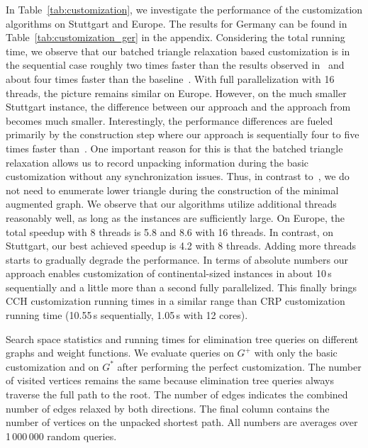 \documentclass[a4paper, english, cleveref]{lipics-v2021}
\begin{document}
In Table~\ref{tab:customization}, we investigate the performance of the customization algorithms on Stuttgart and Europe.
The results for Germany can be found in Table~\ref{tab:customization_ger} in the appendix.
Considering the total running time, we observe that our batched triangle relaxation based customization is in the sequential case roughly two times faster than the results observed in~\cite{BuchholdSW19} and about four times faster than the baseline~\cite{DibbeltSW16}.
With full parallelization with 16 threads, the picture remains similar on Europe.
However, on the much smaller Stuttgart instance, the difference between our approach and the approach from~\cite{BuchholdSW19} becomes much smaller.
Interestingly, the performance differences are fueled primarily by the construction step where our approach is sequentially four to five times faster than~\cite{BuchholdSW19}.
One important reason for this is that the batched triangle relaxation allows us to record unpacking information during the basic customization without any synchronization issues.
Thus, in contrast to~\cite{BuchholdSW19}, we do not need to enumerate lower triangle during the construction of the minimal augmented graph.
We observe that our algorithms utilize additional threads reasonably well, as long as the instances are sufficiently large.
On Europe, the total speedup with 8 threads is 5.8 and 8.6 with 16 threads.
In contrast, on Stuttgart, our best achieved speedup is 4.2 with 8 threads.
Adding more threads starts to gradually degrade the performance.
In terms of absolute numbers our approach enables customization of continental-sized instances in about 10\,s sequentially and a little more than a second fully parallelized.
This finally brings CCH customization running times in a similar range than CRP customization running time (10.55\,s sequentially, 1.05\,s with 12 cores).

\begin{table}
\centering
\setlength{\tabcolsep}{5pt}
\caption{
Search space statistics and running times for elimination tree queries on different graphs and weight functions.
We evaluate queries on $G^+$ with only the basic customization and on $G^*$ after performing the perfect customization.
The number of visited vertices remains the same because elimination tree queries always traverse the full path to the root.
The number of edges indicates the combined number of edges relaxed by both directions.
The final column contains the number of vertices on the unpacked shortest path.
All numbers are averages over 1\,000\,000 random queries.
}\label{tab:queries}

\end{table}
\end{document}
